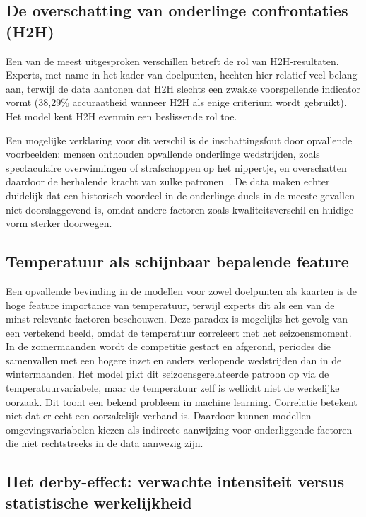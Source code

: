 \subsection{De overschatting van onderlinge confrontaties (H2H)}

Een van de meest uitgesproken verschillen betreft de rol van H2H-resultaten.
Experts, met name in het kader van doelpunten, hechten hier relatief veel belang aan,
terwijl de data aantonen dat H2H slechts een zwakke voorspellende indicator vormt (38,29\% accuraatheid wanneer H2H als enige criterium wordt gebruikt).
Het model kent H2H evenmin een beslissende rol toe.

\vspace{5pt}

Een mogelijke verklaring voor dit verschil is de inschattingsfout door opvallende voorbeelden:
mensen onthouden opvallende onderlinge wedstrijden, zoals spectaculaire overwinningen of strafschoppen op het nippertje,
en overschatten daardoor de herhalende kracht van zulke patronen~\autocite{Dietvorst2015}.
De data maken echter duidelijk dat een historisch voordeel in de onderlinge duels in de meeste gevallen
niet doorslaggevend is, omdat andere factoren zoals kwaliteitsverschil en huidige vorm sterker doorwegen.

\subsection{Temperatuur als schijnbaar bepalende feature}

Een opvallende bevinding in de modellen voor zowel doelpunten als kaarten is de hoge feature importance van temperatuur,
terwijl experts dit als een van de minst relevante factoren beschouwen.
Deze paradox is mogelijks het gevolg van een vertekend beeld, omdat de temperatuur correleert met het seizoensmoment.
In de zomermaanden wordt de competitie gestart en afgerond, periodes die samenvallen
met een hogere inzet en anders verlopende wedstrijden dan in de wintermaanden.
Het model pikt dit seizoensgerelateerde patroon op via de temperatuurvariabele,
maar de temperatuur zelf is wellicht niet de werkelijke oorzaak.
Dit toont een bekend probleem in machine learning. Correlatie betekent niet dat er echt een oorzakelijk verband is. 
Daardoor kunnen modellen omgevingsvariabelen kiezen als indirecte aanwijzing voor onderliggende factoren die niet rechtstreeks in de data aanwezig zijn.

\subsection{Het derby-effect: verwachte intensiteit versus statistische werkelijkheid}

